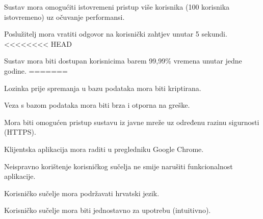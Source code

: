 			 \begin{packed_item}
			 	\item Sustav mora omogućiti istovremeni pristup više korisnika (100 korisnika istovremeno) uz očuvanje performansi.
			 	\item Poslužitelj mora vratiti odgovor na korisnički zahtjev unutar 5 sekundi.
<<<<<<<< HEAD
			 	\item Sustav mora biti dostupan korisnicima barem 99,99\% vremena unutar jedne godine.
=======
			 	\item Lozinka prije spremanja u bazu podataka mora biti kriptirana.
			 	\item Veza s bazom podataka mora biti brza i otporna na greške.
			 	\item Mora biti omogućen pristup sustavu iz javne mreže uz određenu razinu sigurnosti (HTTPS).
			 	\item Klijentska aplikacija mora raditi u pregledniku Google Chrome.
			 	\item Neispravno korištenje korisničkog sučelja ne smije narušiti funkcionalnost aplikacije.
			 	\item Korisničko sučelje mora podržavati hrvatski jezik.
			 	\item Korisničko sučelje mora biti jednostavno za upotrebu (intuitivno).
			 \end{packed_item}
			 
			 
			 
	